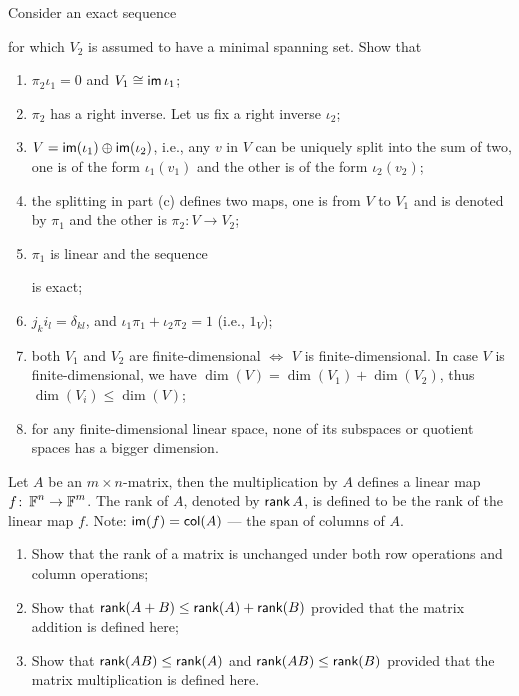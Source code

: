\begin{problem}
Consider an exact sequence
\begin{center}
\end{center}
for which $V_2$ is assumed to have a minimal spanning set. Show that
\begin{enumerate}
  \item $\pi_2 \iota_1 = 0$ and $V_1 \cong \operatorname{\text{\normalfont\sffamily im}} \iota_1$;
  \item $\pi_2$ has a right inverse. Let us fix a right inverse $\iota_2$;
  \item $V = \operatorname{\text{\normalfont\sffamily im}}(\iota_1) \oplus \operatorname{\text{\normalfont\sffamily im}}(\iota_2)$, i.e., any $v$ in $V$ can be uniquely split into the sum of two, one is of the form $\iota_1(v_1)$ and the other is of the form $\iota_2(v_2)$;
  \item the splitting in part (c) defines two maps, one is from $V$ to $V_1$ and is denoted by $\pi_1$ and the other is $\pi_2 \colon V \to V_2$;
  \item $\pi_1$ is linear and the sequence
        \begin{center}
        \end{center}
        is exact;
  \item $j_k i_l = \delta_{kl}$, and $\iota_1 \pi_1 + \iota_2 \pi_2 = 1$ (i.e., $1_V$);
  \item both $V_1$ and $V_2$ are finite-dimensional $\iff$ $V$ is finite-dimensional. In case $V$ is finite-dimensional, we have $\dim(V) = \dim(V_1) + \dim(V_2)$, thus $\dim(V_i) \leq \dim(V)$;
  \item for any finite-dimensional linear space, none of its subspaces or quotient spaces has a bigger dimension.
\end{enumerate}
\end{problem}

\begin{problem}
Let $A$ be an $m \times n$-matrix, then the multiplication by $A$ defines a linear map $f \colon \operatorname{\mathbb{F}}^n \to \operatorname{\mathbb{F}}^m$. The rank of $A$, denoted by $\operatorname{\text{\normalfont\sffamily rank}}{A}$, is defined to be the rank of the linear map $f$. Note: $\operatorname{\text{\normalfont\sffamily im}}(f) = \operatorname{\text{\normalfont\sffamily col}}(A)$ --- the span of columns of $A$.
\begin{enumerate}
  \item Show that the rank of a matrix is unchanged under both row operations and column operations;
  \item Show that $\operatorname{\text{\normalfont\sffamily rank}}(A + B) \leq \operatorname{\text{\normalfont\sffamily rank}}(A) + \operatorname{\text{\normalfont\sffamily rank}}(B)$ provided that the matrix addition is defined here;
  \item Show that $\operatorname{\text{\normalfont\sffamily rank}}(AB) \leq \operatorname{\text{\normalfont\sffamily rank}}(A)$ and $\operatorname{\text{\normalfont\sffamily rank}}(AB) \leq \operatorname{\text{\normalfont\sffamily rank}}(B)$ provided that the matrix multiplication is defined here.
\end{enumerate}
\end{problem}

